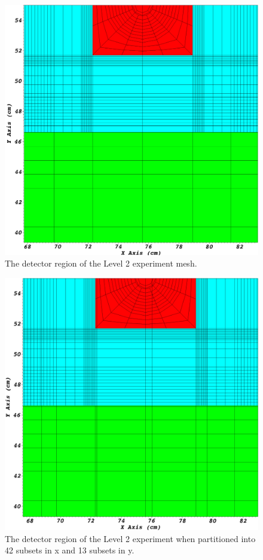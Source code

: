 \begin{figure}[H]
\centering
\includegraphics[scale=0.15]{../../figures/level2_nocut_zoom.png}
\caption{The detector region of the Level 2 experiment mesh.}
\label{level2_nocut_zoom}
\end{figure}

\begin{figure}[H]
\centering
\includegraphics[scale=0.15]{../../figures/level2_42x13_zoom.png}
\caption{The detector region of the Level 2 experiment when partitioned into 42 subsets in x and 13 subsets in y.}
\label{level2_42x13_zoom}
\end{figure}

